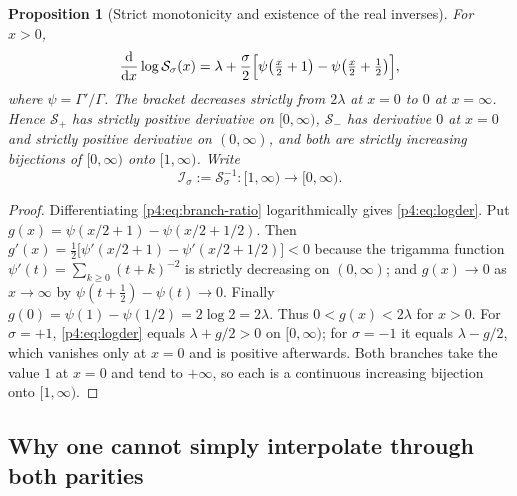 \documentclass[11pt,a4paper,oneside]{book}
\theoremstyle{plain}
\newtheorem{proposition}[theorem]{Proposition}
\theoremstyle{definition}
\theoremstyle{remark}
\newcommand{\dd}{\mathrm{d}}
\begin{document}
\begin{proposition}[Strict monotonicity and existence of the real inverses]
\label{p4:prop:monotone}
For $x>0$,
\begin{equation}
  \frac{\dd}{\dd x}\log\mathcal S_\sigma(x)
  =\lambda+\frac\sigma2
   \Bigl[\psi\bigl(\tfrac x2+1\bigr)-\psi\bigl(\tfrac x2+\tfrac12\bigr)\Bigr],
  \label{p4:eq:logder}
\end{equation}
where $\psi=\Gamma'/\Gamma$.  The bracket decreases strictly from $2\lambda$ at
$x=0$ to $0$ at $x=\infty$.  Hence $\mathcal S_+$ has strictly positive
derivative on $[0,\infty)$, $\mathcal S_-$ has derivative $0$ at $x=0$ and
strictly positive derivative on $(0,\infty)$, and both are strictly increasing
bijections of $[0,\infty)$ onto $[1,\infty)$.  Write
\begin{equation}
  \mathcal I_\sigma:=\mathcal S_\sigma^{-1}:[1,\infty)\to[0,\infty).
  \label{p4:eq:inverse-def}
\end{equation}
\end{proposition}

\begin{proof}
Differentiating \cref{p4:eq:branch-ratio} logarithmically gives
\cref{p4:eq:logder}.  Put
$g(x)=\psi(x/2+1)-\psi(x/2+1/2)$.  Then
$g'(x)=\tfrac12\bigl[\psi'(x/2+1)-\psi'(x/2+1/2)\bigr]<0$ because the
trigamma function $\psi'(t)=\sum_{k\ge0}(t+k)^{-2}$ is strictly decreasing on
$(0,\infty)$; and $g(x)\to0$ as $x\to\infty$ by
$\psi(t+\tfrac12)-\psi(t)\to0$.  Finally $g(0)=\psi(1)-\psi(1/2)=2\log2
=2\lambda$.  Thus $0<g(x)<2\lambda$ for $x>0$.  For $\sigma=+1$,
\cref{p4:eq:logder} equals $\lambda+g/2>0$ on $[0,\infty)$; for $\sigma=-1$ it
equals $\lambda-g/2$, which vanishes only at $x=0$ and is positive afterwards.
Both branches take the value $1$ at $x=0$ and tend to $+\infty$, so each is a
continuous increasing bijection onto $[1,\infty)$.
\end{proof}

\subsection{Why one cannot simply interpolate through both parities}
\end{document}
